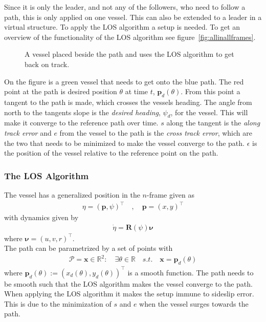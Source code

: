 Since it is only the leader, and not any of the followers, who need to follow a path, this is only applied on one vessel. This can also be extended to a leader in a virtual structure. To apply the \ac{LOS} algorithm a setup is needed. To get an overview of the functionality of the \ac{LOS} algorithm see figure~\vref{fig:allinallframes}.
\begin{figure}[htbp]
	\centering
	
	\caption{A vessel placed beside the path and uses the \ac{LOS} algorithm to get back on track.}
	\label{fig:allinallframes}
\end{figure}
On the figure is a green vessel that needs to get onto the blue path. The red point at the path is desired position $\theta$ at time $t$, $\textbf{p}_d(\theta)$. From this point a tangent to the path is made, which crosses the vessels heading. The angle from north to the tangents slope is the \textit{desired heading}, $\psi_d$, for the vessel. This will make it converge to the reference path over time. $s$ along the tangent is the \textit{along track error} and $e$ from the vessel to the path is the \textit{cross track error}, which are  the two that needs to be minimized to make the vessel converge to the path. $\epsilon$ is the position of the vessel relative to the reference point on the path.

\subsubsection{The \ac{LOS} Algorithm}
The vessel has a generalized position in the ${n}$-frame given as
\begin{align}
\eta = (\textbf{p},\psi)^\top\quad , \quad \textbf{p} = (x,y)^\top
\end{align}
with dynamics given by
\begin{align}
\dot{\eta} = \textbf{R}(\psi)\boldsymbol{\nu}
\end{align}
where $\boldsymbol{\nu} = (u,v,r)^\top$.\\
The path can be parametrized by a set of points with
\begin{align}
\mathcal{P} = {\textbf{x}}\in\mathds{R}^2 : \quad \exists \theta \in \mathds{R} \quad s.t. \quad \textbf{x} = \textbf{p}_d(\theta)
\end{align}
where $\textbf{p}_d(\theta) := (x_d(\theta),y_d(\theta))^\top$ is a smooth function. The path needs to be smooth such that the \ac{LOS} algorithm makes the vessel converge to the path. When applying the \ac{LOS} algorithm it makes the setup immune to sideslip error. This is due to the minimization of $s$ and $e$ when the vessel surges towards the path.

